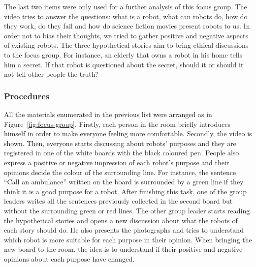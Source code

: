 The last two items were only used for a further analysis of this focus group.
The video tries to answer the questions: what is a robot, what can robots do, how do they work, do they fail and how do science fiction movies present robots to us.
In order not to bias their thoughts, we tried to gather positive and negative aspects of existing robots.
The three hypothetical stories aim to bring ethical discussions to the focus group.
For instance, an elderly that owns a robot in his home tells him a secret.
If that robot is questioned about the secret, should it or should it not tell other people the truth?

\subsubsection{Procedures}
All the materials enumerated in the previous list were arranged as in Figure~\ref{fig:focus-group}.
Firstly, each person in the room briefly introduces himself in order to make everyone feeling more comfortable.
Secondly, the video is shown.
Then, everyone starts discussing about robots' purposes and they are registered in one of the white boards with the black coloured pen.
People also express a positive or negative impression of each robot's purpose and their opinions decide the colour of the surrounding line.
For instance, the sentence ``Call an ambulance'' written on the board is surrounded by a green line if they think it is a good purpose for a robot.
After finishing this task, one of the group leaders writes all the sentences previously collected in the second board but without the surrounding green or red lines.
The other group leader starts reading the hypothetical stories and opens a new discussion about what the robots of each story should do.
He also presents the photographs and tries to understand which robot is more suitable for each purpose in their opinion.
When bringing the new board to the room, the idea is to understand if their positive and negative opinions about each purpose have changed.

